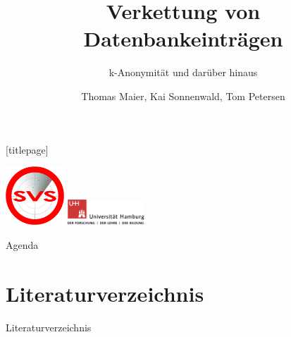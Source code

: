 \documentclass[t]{beamer}
\title{Verkettung von Datenbankeinträgen}
\subtitle{k-Anonymität und darüber hinaus}
\author[]{Thomas Maier, Kai Sonnenwald, Tom Petersen}
\institute[Uni Hamburg]{Universität Hamburg\\ Fachbereich Informatik}
\date{}
\begin{document}
\begingroup
	[titlepage]
	\begin{frame}[plain]
		\vskip8mm
		\includegraphics[width=2.2cm]{pic/svs_logo_hires-ohne-was.png}
		\titlepage
		\vspace{\fill}
		\includegraphics[width=2.9cm]{pic/UHH-Logo_2010_Farbe_RGB_hires_nomargin.png}
		\vskip20pt
	\end{frame}
\endgroup

\begin{frame}{Agenda}
	\tableofcontents
\end{frame}









\section{Literaturverzeichnis}

\begin{frame}[allowframebreaks]{Literaturverzeichnis}
\nocite{*}


\end{frame}
\end{document}
